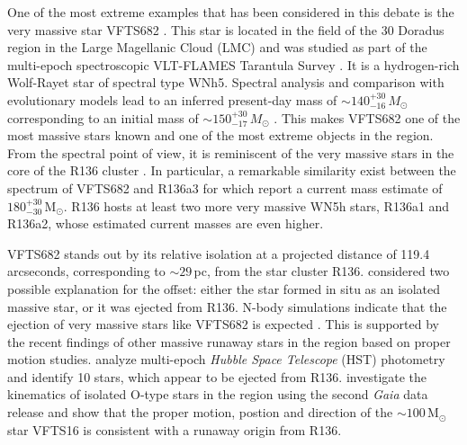 \documentclass[apjl,twocolumn]{emulateapj}
\newcommand{\Msun}{{\,\mathrm{M}_\odot}}
\begin{document}
One of the most extreme examples that has been considered in this debate is the very massive star VFTS682  \citep[][]{bestenlehner:11, bressert:12}. This star is located in the field of the 30 Doradus region in the Large Magellanic Cloud (LMC) and was studied as part of the multi-epoch spectroscopic VLT-FLAMES Tarantula Survey \citep[VFTS,][]{evans:11}. It is a hydrogen-rich Wolf-Rayet star of spectral type WNh5. Spectral analysis and comparison with evolutionary models lead to an inferred present-day mass of $\sim$$140^{+30}_{-16}\,M_\odot$ corresponding to an initial mass of $\sim$$150^{+30}_{-17}\,M_\odot$
\citep{schneider:18}. 
%
%
This makes VFTS682 one of the most massive stars known and one of the most extreme objects in the region.
%
From the spectral point of view, it is reminiscent of the very
massive stars %
 in the core of the R136 cluster \citep{dekoter:97,crowther:10, crowther:16}. 
 In particular, a remarkable similarity exist between the
spectrum of VFTS682 and R136a3 \citep{rubio-diez:17} for which \citet{crowther:16} report a
current mass estimate of $180^{+30}_{-30}\Msun$. R136 hosts
at least two more very massive WN5h stars, R136a1 and R136a2, whose
estimated current masses are even higher. 


VFTS682 stands out by its relative isolation at a projected distance of 119.4 arcseconds, corresponding to 
$\sim$$29$\,pc, from  the star cluster R136. \citet{bestenlehner:11}
considered two possible explanation for the offset: either
the star formed in situ as an isolated massive star, %
or it was ejected from  R136. N-body simulations %
indicate that the ejection of very massive stars like VFTS682 is expected \citep[e.g.][]{fujii:11, banerjee:12}.  This is supported by the recent findings of other massive runaway stars in the region based on proper motion studies.   \citet{platais:15,platais:18} analyze multi-epoch \emph{Hubble Space Telescope} (HST) photometry and identify 10 stars, which appear to be ejected from R136.   \citet{lennon:18} investigate the kinematics of  isolated O-type stars in the region using the second \emph{Gaia} data release \cite[DR2,][]{gaia:16,brown:18} and show that the proper motion, postion and direction of the $\sim100\Msun$ star VFTS16 is consistent with a runaway origin from R136. 
\end{document}
